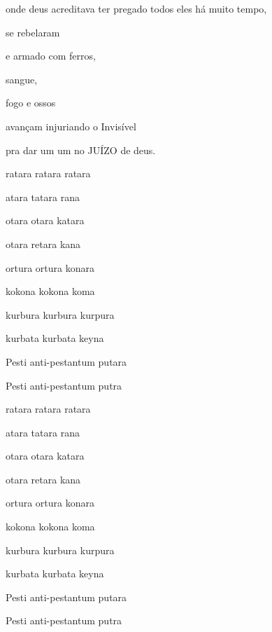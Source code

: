 
onde deus acreditava ter pregado todos eles há muito tempo,

se rebelaram

e armado com ferros,

sangue,

fogo e ossos

avançam injuriando o Invisível

pra dar um um no JUÍZO de deus.




\begin{center}
ratara ratara ratara

atara tatara rana

otara otara katara

otara retara kana

ortura ortura konara

kokona kokona koma

kurbura kurbura kurpura

kurbata kurbata keyna

Pesti anti-pestantum putara

Pesti anti-pestantum putra
\end{center}


\begin{center}
ratara ratara ratara

atara tatara rana

otara otara katara

otara retara kana

ortura ortura konara

kokona kokona koma

kurbura kurbura kurpura

kurbata kurbata keyna

Pesti anti-pestantum putara

Pesti anti-pestantum putra
\end{center}

